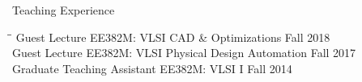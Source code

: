 \begin{rSection}{Teaching Experience}

\begin{tabbing}
\hspace{3.3in}\= \hspace{3.1in}\= \kill
Guest Lecture \> EE382M: VLSI CAD \& Optimizations \> Fall 2018 \\
Guest Lecture \> EE382M: VLSI Physical Design Automation \> Fall 2017 \\
Graduate Teaching Assistant \> EE382M: VLSI I \> Fall 2014 
\end{tabbing}

\end{rSection}
